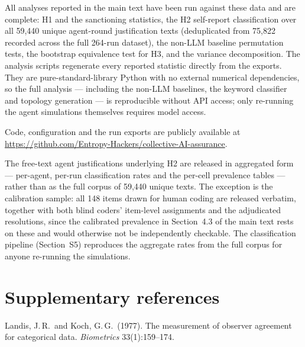 \documentclass[11pt,a4paper]{article}
\begin{document}
All analyses reported in the main text have been run against these
data and are complete: H1 and the sanctioning statistics, the H2
self-report classification over all 59,440 unique agent-round
justification texts (deduplicated from 75,822 recorded across the full
264-run dataset), the non-LLM baseline permutation tests, the
bootstrap equivalence test for H3, and the variance decomposition.
The analysis scripts regenerate every reported statistic directly
from the exports. They are pure-standard-library Python with no
external numerical dependencies, so the full analysis --- including
the non-LLM baselines, the keyword classifier and topology generation
--- is reproducible without API access; only re-running the agent
simulations themselves requires model access.

Code, configuration and the run exports are publicly available at
\url{https://github.com/Entropy-Hackers/collective-AI-assurance}.

The free-text agent justifications underlying H2 are released in
aggregated form --- per-agent, per-run classification rates and the
per-cell prevalence tables --- rather than as the full corpus of
59,440 unique texts.
The exception is the calibration sample: all 148 items
drawn for human coding are released verbatim, together with both blind
coders' item-level assignments and the adjudicated resolutions, since
the calibrated prevalence in Section~4.3 of the main text rests on
these and would otherwise not be independently checkable. The
classification pipeline (Section~S5) reproduces the aggregate rates
from the full corpus for anyone re-running the simulations.

\section*{Supplementary references}

\noindent [S1] Landis, J.\,R.\ and Koch, G.\,G.\ (1977). The
measurement of observer agreement for categorical data.
\emph{Biometrics} 33(1):159--174.
\end{document}
